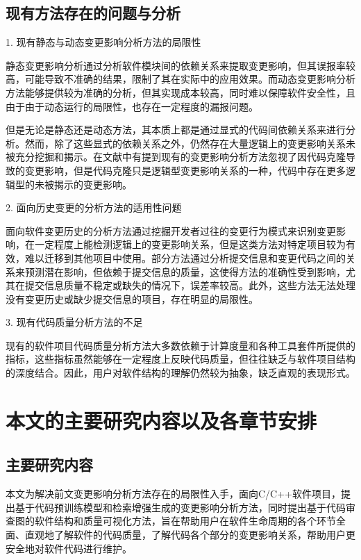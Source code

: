\subsection{现有方法存在的问题与分析}

1. 现有静态与动态变更影响分析方法的局限性

静态变更影响分析通过分析软件模块间的依赖关系来提取变更影响，但其误报率较高，可能导致不准确的结果，限制了其在实际中的应用效果。而动态变更影响分析方法能够提供较为准确的分析，但其实现成本较高，同时难以保障软件安全性，且由于由于动态运行的局限性，也存在一定程度的漏报问题。

但是无论是静态还是动态方法，其本质上都是通过显式的代码间依赖关系来进行分析。然而，除了这些显式的依赖关系之外，仍然存在大量逻辑上的变更影响关系未被充分挖掘和揭示。在文献\cite{daipeng2024software}中有提到现有的变更影响分析方法忽视了因代码克隆导致的变更影响，但是代码克隆只是逻辑型变更影响关系的一种，代码中存在更多逻辑型的未被揭示的变更影响。

2. 面向历史变更的分析方法的适用性问题

面向软件变更历史的分析方法通过挖掘开发者过往的变更行为模式来识别变更影响，在一定程度上能检测逻辑上的变更影响关系，但是这类方法对特定项目较为有效，难以迁移到其他项目中使用。部分方法通过分析提交信息和变更代码之间的关系来预测潜在影响，但依赖于提交信息的质量，这使得方法的准确性受到影响，尤其在提交信息质量不稳定或缺失的情况下，误差率较高。此外，这些方法无法处理没有变更历史或缺少提交信息的项目，存在明显的局限性。

3. 现有代码质量分析方法的不足

现有的软件项目代码质量分析方法大多数依赖于计算度量和各种工具套件所提供的指标，这些指标虽然能够在一定程度上反映代码质量，但往往缺乏与软件项目结构的深度结合。因此，用户对软件结构的理解仍然较为抽象，缺乏直观的表现形式。



\section{本文的主要研究内容以及各章节安排}
\subsection{主要研究内容}

本文为解决前文变更影响分析方法存在的局限性入手，面向C/C++软件项目，提出基于代码预训练模型和检索增强生成的变更影响分析方法，同时提出基于代码审查图的软件结构和质量可视化方法，旨在帮助用户在软件生命周期的各个环节全面、直观地了解软件的代码质量，了解代码各个部分的变更影响关系，帮助用户更安全地对软件代码进行维护。

